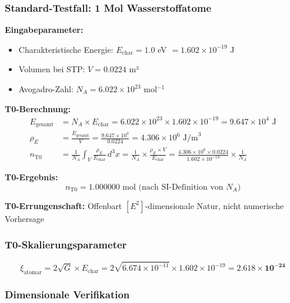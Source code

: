 \documentclass[12pt,a4paper]{article}
\newcommand{\xipar}{\xi}
\newcommand{\rhoE}{\rho_E}
\newcommand{\Echar}{E_{\text{char}}}
\begin{document}
	\subsubsection{Standard-Testfall: 1 Mol Wasserstoffatome}
	\label{subsubsec:mol_wasserstoff_test}
	
	\textbf{Eingabeparameter:}
	\begin{itemize}
		\item Charakteristische Energie: $\Echar = 1.0$ eV $= 1.602 \times 10^{-19}$ J
		\item Volumen bei STP: $V = 0.0224$ m³
		\item Avogadro-Zahl: $N_A = 6.022 \times 10^{23}$ mol$^{-1}$
	\end{itemize}
	
	\textbf{T0-Berechnung:}
	\begin{align}
		E_{\text{gesamt}} &= N_A \times \Echar = 6.022 \times 10^{23} \times 1.602 \times 10^{-19} = 9.647 \times 10^{4} \text{ J} \\
		\rhoE &= \frac{E_{\text{gesamt}}}{V} = \frac{9.647 \times 10^{4}}{0.0224} = 4.306 \times 10^{6} \text{ J/m}^3 \\
		n_{\text{T0}} &= \frac{1}{N_A} \int_V \frac{\rhoE}{\Echar} \, d^3x = \frac{1}{N_A} \times \frac{\rhoE \times V}{\Echar} = \frac{4.306 \times 10^{6} \times 0.0224}{1.602 \times 10^{-19}} \times \frac{1}{N_A}
	\end{align}
	
	\textbf{T0-Ergebnis:}
	\begin{equation}
		\boxed{n_{\text{T0}} = 1.000000 \text{ mol (nach SI-Definition von } N_A\text{)}}
		\label{eq:mol_t0_ergebnis}
	\end{equation}
	
	\textbf{T0-Errungenschaft:} Offenbart $[E^2]$-dimensionale Natur, nicht numerische Vorhersage
	
	\subsubsection{T0-Skalierungsparameter}
	\label{subsubsec:mol_skalierungsparameter}
	
	\begin{equation}
		\xipar_{\text{atomar}} = 2\sqrt{G} \times \Echar = 2\sqrt{6.674 \times 10^{-11}} \times 1.602 \times 10^{-19} = \mathbf{2.618 \times 10^{-24}}
		\label{eq:xi_atomar_berechnet}
	\end{equation}
	
	\subsubsection{Dimensionale Verifikation}
	\label{subsubsec:mol_dimensionale_verifikation}
	
\end{document}
